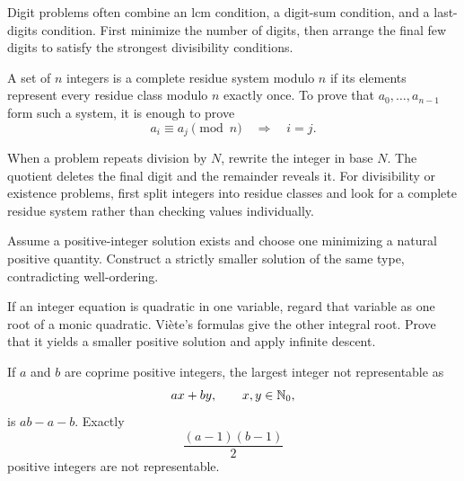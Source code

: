     \begin{strategy}
        Digit problems often combine an lcm condition, a digit-sum condition,
        and a last-digits condition. First minimize the number of digits, then
        arrange the final few digits to satisfy the strongest divisibility
        conditions.
    \end{strategy}

    \begin{definition}
        A set of $n$ integers is a complete residue system modulo $n$ if its
        elements represent every residue class modulo $n$ exactly once. To prove
        that $a_0,\dots,a_{n-1}$ form such a system, it is enough to prove
        \[
            a_i\equiv a_j\pmod n
            \quad\Longrightarrow\quad
            i=j.
        \]
    \end{definition}

    \begin{strategy}
        When a problem repeats division by $N$, rewrite the integer in base $N$.
        The quotient deletes the final digit and the remainder reveals it. For
        divisibility or existence problems, first split integers into residue
        classes and look for a complete residue system rather than checking
        values individually.
    \end{strategy}

    \begin{strategy}
        Assume a positive-integer solution exists and choose one minimizing a
        natural positive quantity. Construct a strictly smaller solution of the
        same type, contradicting well-ordering.
    \end{strategy}

    \begin{strategy}
        If an integer equation is quadratic in one variable, regard that
        variable as one root of a monic quadratic. Vi\`ete's formulas give the
        other integral root. Prove that it yields a smaller positive solution
        and apply infinite descent.
    \end{strategy}

    \begin{theorem}
        If $a$ and $b$ are coprime positive integers, the largest integer not
        representable as
        \[
            ax+by,
            \qquad
            x,y\in\mathbb{N}_0,
        \]
        is $ab-a-b$. Exactly
        \[
            \frac{(a-1)(b-1)}{2}
        \]
        positive integers are not representable.
    \end{theorem}

